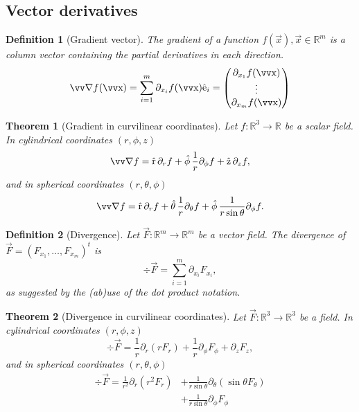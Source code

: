 \documentclass[margin=normal]{tex/hsrzf}
\theoremstyle{elmagzf}
\newtheorem{theorem}{Theorem}
\newtheorem{definition}{Definition}
\begin{document}
\subsection{Vector derivatives}

\begin{definition}[Gradient vector]
  The \emph{gradient} of a function \(f(\vec{x}), \vec{x}\in\mathbb{R}^m\) is a
  column vector containing the partial derivatives
  in each direction.
  \[
    \grad f (\vec{x}) = \sum_{i=1}^m \partial_{x_i} f(\vec{x}) \uvec{e}_i
      = \begin{pmatrix}
        \partial_{x_1} f(\vec{x}) \\
        \vdots \\
        \partial_{x_m} f(\vec{x}) \\
      \end{pmatrix}
  \]
\end{definition}

\begin{theorem}[Gradient in curvilinear coordinates]
  Let \(f: \mathbb{R}^3 \to \mathbb{R}\) be a scalar field. In cylindrical
  coordinates \((r,\phi,z)\)
  \[
    \grad f = \uvec{r}\,\partial_r f 
      + \uvec{\phi}\,\frac{1}{r}\partial_\phi f
      + \uvec{z}\,\partial_z f,
  \]
  and in spherical coordinates \((r,\theta,\phi)\)
  \[
    \grad f = \uvec{r}\,\partial_r f
      + \uvec{\theta}\,\frac{1}{r} \partial_\theta f
      + \uvec{\phi}\,\frac{1}{r \sin\theta} \partial_\phi f.
  \]
\end{theorem}

\begin{definition}[Divergence]
  Let \(\vec{F}: \mathbb{R}^m \to \mathbb{R}^m\) be a vector field.
  The divergence of \(\vec{F} = (F_{x_1},\ldots, F_{x_m})^t\) is
  \[
    \div\vec{F} = \sum_{i = 1}^m \partial_{x_i} F_{x_i} ,
  \]
  as suggested by the (ab)use of the dot product notation.
\end{definition}

\begin{theorem}[Divergence in curvilinear coordinates]
  Let \(\vec{F}: \mathbb{R}^3 \to \mathbb{R}^3\) be a field. In cylindrical
  coordinates \((r,\phi,z)\)
  \[
    \div \vec{F} = \frac{1}{r} \partial_r (r F_r)
      + \frac{1}{r}\partial_\phi F_\phi
      + \partial_z F_z,
  \]
  and in spherical coordinates \((r,\theta,\phi)\)
  \begin{align*}
    \div \vec{F} = \frac{1}{r^2} \partial_r (r^2 F_r)
      & + \frac{1}{r \sin\theta} \partial_\theta (\sin\theta F_\theta) \\
      & + \frac{1}{r \sin\theta} \partial_\phi F_\phi
  \end{align*}
\end{theorem}
\end{document}
